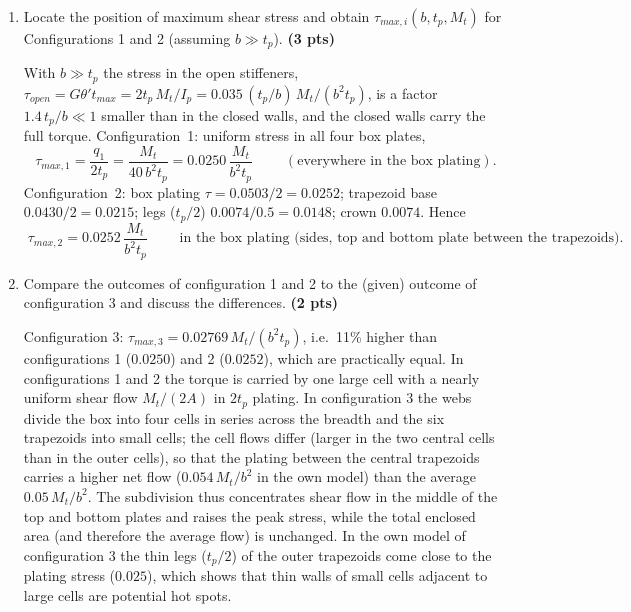 \begin{enumerate}[label=\alph*.]
  \item Locate the position of maximum shear stress and obtain $\tau_{max,i}(b,t_p,M_t)$ for Configurations 1 and 2 (assuming $b\gg t_p$). \textbf{(3 pts)}

  With $b\gg t_p$ the stress in the open stiffeners, $\tau_{open}=G\theta't_{max}=2t_p\,M_t/I_p=0.035\,(t_p/b)\,M_t/(b^2t_p)$, is a factor $1.4\,t_p/b\ll1$ smaller than in the closed walls, and the closed walls carry the full torque. Configuration~1: uniform stress in all four box plates,
  \begin{equation}
    \boxed{\;\tau_{max,1}=\frac{q_1}{2t_p}=\frac{M_t}{40\,b^2t_p}=0.0250\,\frac{M_t}{b^2t_p}\;}\qquad(\text{everywhere in the box plating}).
  \end{equation}
  Configuration~2: box plating $\tau=0.0503/2=0.0252$; trapezoid base $0.0430/2=0.0215$; legs ($t_p/2$) $0.0074/0.5=0.0148$; crown $0.0074$. Hence
  \begin{equation}
    \boxed{\;\tau_{max,2}=0.0252\,\frac{M_t}{b^2t_p}\;}\qquad\text{in the box plating (sides, top and bottom plate between the trapezoids)}.
  \end{equation}

  \item Compare the outcomes of configuration 1 and 2 to the (given) outcome of configuration 3 and discuss the differences. \textbf{(2 pts)}

  Configuration 3: $\tau_{max,3}=0.02769\,M_t/(b^2t_p)$, i.e.\ 11\% higher than configurations 1 ($0.0250$) and 2 ($0.0252$), which are practically equal. In configurations 1 and 2 the torque is carried by one large cell with a nearly uniform shear flow $M_t/(2A)$ in $2t_p$ plating. In configuration 3 the webs divide the box into four cells in series across the breadth and the six trapezoids into small cells; the cell flows differ (larger in the two central cells than in the outer cells), so that the plating between the central trapezoids carries a higher net flow ($0.054\,M_t/b^2$ in the own model) than the average $0.05\,M_t/b^2$. The subdivision thus concentrates shear flow in the middle of the top and bottom plates and raises the peak stress, while the total enclosed area (and therefore the average flow) is unchanged. In the own model of configuration 3 the thin legs ($t_p/2$) of the outer trapezoids come close to the plating stress ($0.025$), which shows that thin walls of small cells adjacent to large cells are potential hot spots.
\end{enumerate}


